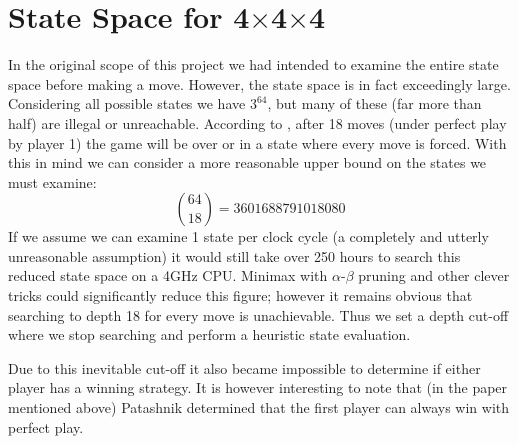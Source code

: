 \documentclass[10pt,twocolumn]{article}
\begin{document}
\section{State Space for 4$\times$4$\times$4}
In the original scope of this project we had intended to examine the entire state space
before making a move. However, the state space is in fact exceedingly large. Considering all
possible states we have $3^{64}$, but many of these (far more than half) are illegal or unreachable.
According to \cite{Patashnik1980}, after 18 moves (under perfect play by player 1)
the game will be over or in a state where every move is forced. With this in mind we can 
consider a more reasonable upper bound on the states we must examine:
 \[\binom{64}{18} = 3601688791018080\]
If we assume we can examine 1 state per clock cycle (a completely and utterly unreasonable assumption) it would
still take over 250 hours to search this reduced state space on a 4GHz CPU. Minimax with $\alpha$-$\beta$ pruning
and other clever tricks could significantly reduce this figure; however it remains obvious that
searching to depth 18 for every move is unachievable. Thus we set a depth cut-off where we stop
searching and perform a heuristic state evaluation.

Due to this inevitable cut-off it also became impossible to determine if either
player has a winning strategy. It is however interesting to note that (in the paper
mentioned above) Patashnik determined that the first player can always win with perfect play. 
\end{document}
